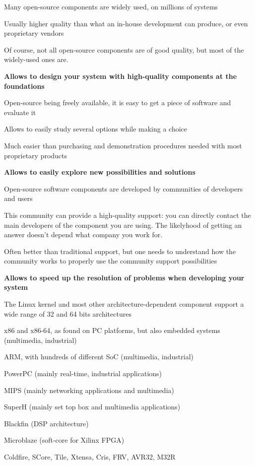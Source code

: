 \startitemize
\item Many open-source components are widely used, on millions of
  systems
\item Usually higher quality than what an in-house development can
  produce, or even proprietary vendors
\item Of course, not all open-source components are of good quality,
  but most of the widely-used ones are.
\item {\bf Allows to design your system with high-quality components
  at the foundations}
\stopitemize

\startitemize
\item Open-source being freely available, it is easy to get a piece
  of software and evaluate it
\item Allows to easily study several options while making a choice
\item Much easier than purchasing and demonstration procedures
  needed with most proprietary products
\item {\bf Allows to easily explore new possibilities and solutions}
\stopitemize

\startitemize
\item Open-source software components are developed by communities
  of developers and users
\item This community can provide a high-quality support: you can
  directly contact the main developers of the component you are
  using. The likelyhood of getting an answer doesn't depend what
  company you work for.
\item Often better than traditional support, but one needs to
  understand how the community works to properly use the community
  support possibilities
\item {\bf Allows to speed up the resolution of problems when
  developing your system}
\stopitemize

\startitemize
\item The Linux kernel and most other architecture-dependent component support a
  wide range of 32 and 64 bits architectures
  \startitemize
  \item x86 and x86-64, as found on PC platforms, but also embedded systems
    (multimedia, industrial)
  \item ARM, with hundreds of different SoC (multimedia, industrial)
  \item PowerPC (mainly real-time, industrial applications)
  \item MIPS (mainly networking applications and multimedia)
  \item SuperH (mainly set top box and multimedia applications)
  \item Blackfin (DSP architecture)
  \item Microblaze (soft-core for Xilinx FPGA)
  \item Coldfire, SCore, Tile, Xtensa, Cris, FRV, AVR32, M32R
  \stopitemize
\stopitemize


